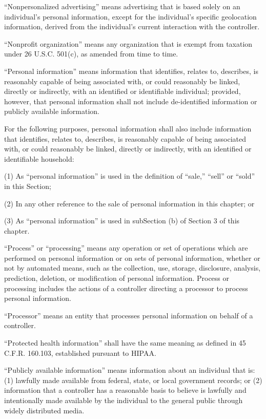 “Nonpersonalized advertising” means advertising that is based solely on an individual’s personal information, except for the individual’s specific geolocation information, derived from the individual’s current interaction with the controller.

“Nonprofit organization” means any organization that is exempt from taxation under 26 U.S.C. 501(c), as amended from time to time.

“Personal information” means information that identifies, relates to, describes, is reasonably capable of being associated with, or could reasonably be linked, directly or indirectly, with an identified or identifiable individual; provided, however, that personal information shall not include de-identified information or publicly available information.

For the following purposes, personal information shall also include information that identifies, relates to, describes, is reasonably capable of being associated with, or could reasonably be linked, directly or indirectly, with an identified or identifiable household:

(1) As “personal information” is used in the definition of “sale,” “sell” or “sold” in this Section;

(2) In any other reference to the sale of personal information in this chapter; or

(3) As “personal information” is used in subSection (b) of Section 3 of this chapter.

“Process” or “processing” means any operation or set of operations which are performed on personal information or on sets of personal information, whether or not by automated means, such as the collection, use, storage, disclosure, analysis, prediction, deletion, or modification of personal information. Process or processing includes the actions of a controller directing a processor to process personal information.

“Processor” means an entity that processes personal information on behalf of a controller.

“Protected health information” shall have the same meaning as defined in 45 C.F.R. 160.103, established pursuant to HIPAA.

“Publicly available information” means information about an individual that is: (1) lawfully made available from federal, state, or local government records; or (2) information that a controller has a reasonable basis to believe is lawfully and intentionally made available by the individual to the general public through widely distributed media.

